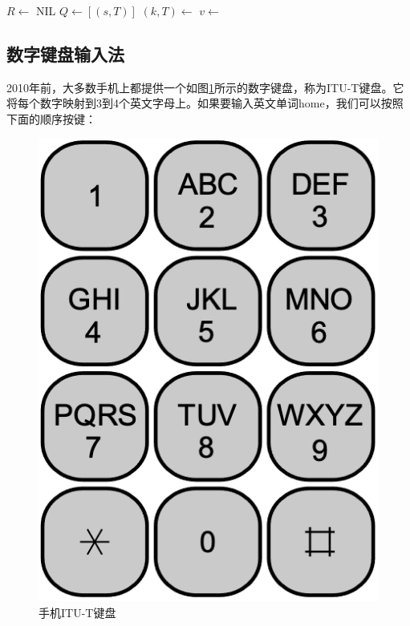 \documentclass[b5paper]{ctexart}
\begin{document}
\begin{algorithmic}[1]
  \State $R \gets $ NIL
  \State $Q \gets [(s, T)]$
    \State $(k, T) \gets$ 
    \State $v \gets$ 
      \State {}
    \EndIf
      \State {}
    \EndFor
  \EndWhile
\EndFunction
\end{algorithmic}


\subsection{数字键盘输入法}

2010年前，大多数手机上都提供一个如图\ref{fig:itut-keypad}所示的数字键盘，称为ITU-T键盘。它将每个数字映射到3到4个英文字母上。如果要输入英文单词home，我们可以按照下面的顺序按键：

\begin{figure}[htbp]
  \centering
  \includegraphics[scale=0.4]{img/itu-t}
  \caption{手机ITU-T键盘}
  \label{fig:itut-keypad}
\end{figure}
\end{document}

